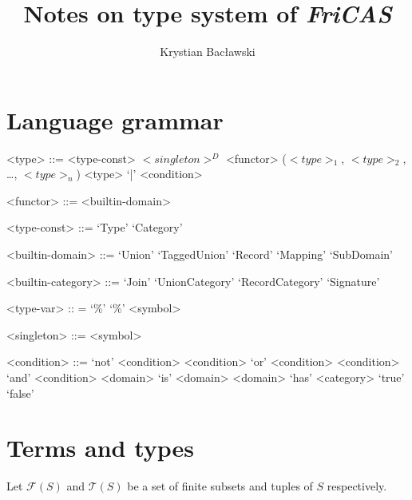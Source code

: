 \documentclass[10pt]{article}
\begin{document}
\title{Notes on type system of \textit{FriCAS}}
\author{Krystian Bacławski}
\maketitle

\section*{Language grammar}

\begin{grammar}
<type> ::= <type-const>
\alt $<singleton>^{D}$
\alt <functor> ($<type>_1$, $<type>_2$, \ldots, $<type>_n$)
\alt <type> `|' <condition>

<functor> ::= <builtin-domain>

<type-const> ::= `Type'
\alt `Category'

<builtin-domain> ::= `Union'
\alt `TaggedUnion'
\alt `Record'
\alt `Mapping'
\alt `SubDomain'

<builtin-category> ::= `Join'
\alt `UnionCategory'
\alt `RecordCategory'
\alt `Signature'

<type-var> :: = `\%'
\alt `\%' <symbol>

<singleton> ::= <symbol>

<condition> ::= `not' <condition>
\alt <condition> `or' <condition>
\alt <condition> `and' <condition>
\alt <domain> `is' <domain>
\alt <domain> `has' <category>
\alt `true'
\alt `false'
\end{grammar}

\clearpage
\section*{Terms and types}

Let $\mathcal{F}(S)$ and $\mathcal{T}(S)$ be a set of finite subsets and tuples
of $S$ respectively.
\end{document}
